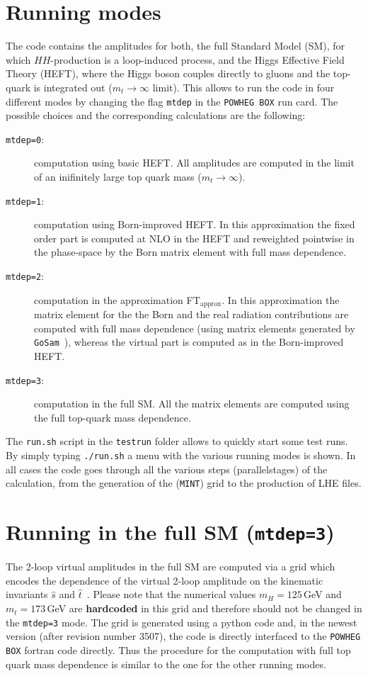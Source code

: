 \documentclass[paper]{JHEP3}
\newcommand\POWHEGBOX{{\tt POWHEG BOX}}
\newcommand\ftapprox{FT$_{\mathrm{approx}}$\xspace}
\begin{document}
\section{Running modes}
The code contains the amplitudes for both, the full Standard Model
(SM), for which $HH$-production is a loop-induced process, and the
Higgs Effective Field Theory (HEFT), where the Higgs boson couples
directly to gluons and the top-quark is integrated out ($m_t\to\infty$
limit).  This allows to run the code in four different modes by
changing the flag {\tt mtdep} in the \POWHEGBOX{} run card. The
possible choices and the corresponding calculations are the following:
\begin{description}
 \item[{\tt mtdep=0}:]{computation using basic HEFT. All amplitudes
   are computed in the limit of an inifinitely large top quark mass
   ($m_t\to\infty$).}
 \item[{\tt mtdep=1}:]{computation using Born-improved HEFT. In this
   approximation the fixed order part is computed at NLO in the HEFT
   and reweighted pointwise in the phase-space by the Born matrix
   element with full mass dependence.}
 \item[{\tt mtdep=2}:]{computation in the approximation \ftapprox. In
   this approximation the matrix element for the the Born and the real
   radiation contributions are computed with full mass dependence
   (using matrix elements generated by {\tt
     GoSam}~\cite{Cullen:2014yla}), whereas the virtual part is
   computed as in the Born-improved HEFT. }
 \item[{\tt mtdep=3}:]{computation in the full SM. All the matrix
   elements are computed using the full top-quark mass dependence.}
\end{description}

The {\tt run.sh} script in the {\tt testrun} folder allows to quickly
start some test runs. By simply typing {\tt ./run.sh} a menu with the
various running modes is shown. In all cases the code goes through all
the various steps (parallelstages) of the calculation, from the
generation of the ({\tt MINT}) grid to the production of LHE files.

\section{Running in the full SM ({\tt mtdep=3})}
The 2-loop virtual amplitudes in the full SM are computed via a grid
which encodes the dependence of the virtual 2-loop amplitude on the
kinematic invariants $\hat{s}$ and
$\hat{t}$~\cite{Heinrich:2017kxx}. Please note that the numerical
values $m_H=125$\,GeV and $m_t=173$\,GeV are {\bf hardcoded} in this
grid and therefore should not be changed in the {\tt mtdep=3} mode.
The grid is generated using a python code and, in the newest version
(after revision number 3507), the code is directly interfaced to the
\POWHEGBOX{} fortran code directly. Thus the procedure for the
computation with full top quark mass dependence is similar to the one
for the other running modes.
\end{document}
